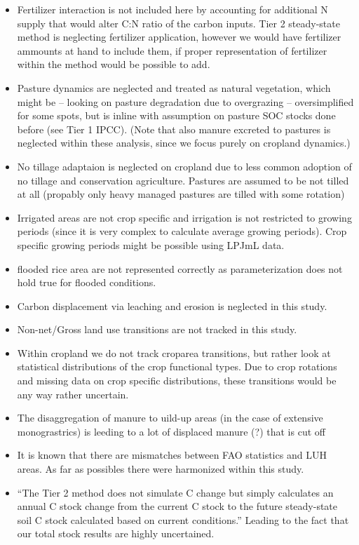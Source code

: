\documentclass[gc, manuscript]{copernicus}
\begin{document}
\begin{itemize}
\item
  Fertilizer interaction is not included here by accounting for additional N supply that would alter C:N ratio of the carbon inputs. Tier 2 steady-state method is neglecting fertilizer application, however we would have fertilizer ammounts at hand to include them, if proper representation of fertilizer within the method would be possible to add.
\item
  Pasture dynamics are neglected and treated as natural vegetation, which might be -- looking on pasture degradation due to overgrazing -- oversimplified for some spots, but is inline with assumption on pasture SOC stocks done before (see Tier 1 IPCC). (Note that also manure excreted to pastures is neglected within these analysis, since we focus purely on cropland dynamics.)
\item
  No tillage adaptaion is neglected on cropland due to less common adoption of no tillage and conservation agriculture. Pastures are assumed to be not tilled at all (propably only heavy managed pastures are tilled with some rotation)
\item
  Irrigated areas are not crop specific and irrigation is not restricted to growing periods (since it is very complex to calculate average growing periods). Crop specific growing periods might be possible using LPJmL data.
\item
  flooded rice area are not represented correctly as parameterization does not hold true for flooded conditions.
\item
  Carbon displacement via leaching and erosion is neglected in this study.
\item
  Non-net/Gross land use transitions are not tracked in this study.
\item
  Within cropland we do not track croparea transitions, but rather look at statistical distributions of the crop functional types. Due to crop rotations and missing data on crop specific distributions, these transitions would be any way rather uncertain.
\item
  The disaggregation of manure to uild-up areas (in the case of extensive monograstrics) is leeding to a lot of displaced manure (?) that is cut off
\item
  It is known that there are mismatches between FAO statistics and LUH areas. As far as possibles there were harmonized within this study.
\item
  ``The Tier 2 method does not simulate C change but simply calculates an annual C stock change from the
  current C stock to the future steady-state soil C stock calculated based on current conditions.'' Leading to the fact that our total stock results are highly uncertained.
  \newpage
\end{itemize}
\end{document}
